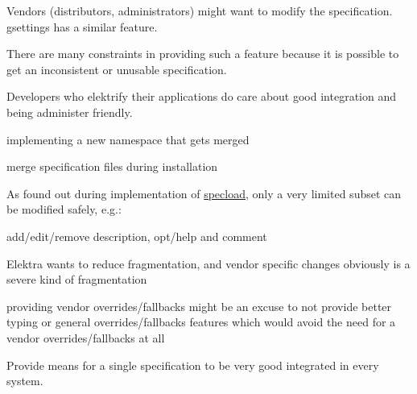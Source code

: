 Vendors (distributors, administrators) might want to modify the specification. gsettings has a similar feature.

There are many constraints in providing such a feature because it is possible to get an inconsistent or unusable specification.

Developers who elektrify their applications do care about good integration and being administer friendly.


\begin{DoxyItemize}
\item implementing a new namespace that gets merged
\item merge specification files during installation
\end{DoxyItemize}

As found out during implementation of \hyperlink{autotoc_md618_src_plugins_specload_README_md}{specload}, only a very limited subset can be modified safely, e.\+g.\+:


\begin{DoxyItemize}
\item add/edit/remove {\ttfamily description}, {\ttfamily opt/help} and {\ttfamily comment}
\end{DoxyItemize}


\begin{DoxyItemize}
\item Elektra wants to reduce fragmentation, and vendor specific changes obviously is a severe kind of fragmentation
\item providing vendor overrides/fallbacks might be an excuse to not provide better typing or general overrides/fallbacks features which would avoid the need for a vendor overrides/fallbacks at all
\end{DoxyItemize}

Provide means for a single specification to be very good integrated in every system.